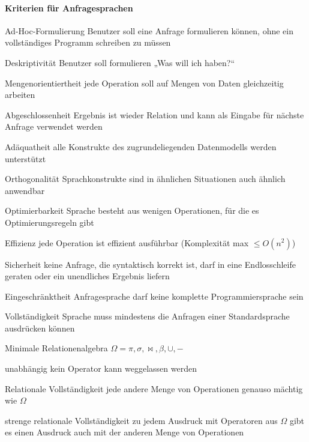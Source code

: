 \documentclass[a4paper]{article}
\begin{document}
\begin{multicols}{3}
    \paragraph{Kriterien für Anfragesprachen}
    \begin{description*}
        \item[Ad-Hoc-Formulierung] Benutzer soll eine Anfrage formulieren können, ohne ein vollständiges Programm schreiben zu müssen
        \item[Deskriptivität] Benutzer soll formulieren „Was will ich haben?“
        \item[Mengenorientiertheit] jede Operation soll auf Mengen von Daten gleichzeitig arbeiten
        \item[Abgeschlossenheit] Ergebnis ist wieder Relation und kann als Eingabe für nächste Anfrage verwendet werden
        \item[Adäquatheit] alle Konstrukte des zugrundeliegenden Datenmodells werden unterstützt
        \item[Orthogonalität] Sprachkonstrukte sind in ähnlichen Situationen auch ähnlich anwendbar
        \item[Optimierbarkeit] Sprache besteht aus wenigen Operationen, für die es Optimierungsregeln gibt
        \item[Effizienz] jede Operation ist effizient ausführbar (Komplexität max $\leq O(n^2)$)
        \item[Sicherheit] keine Anfrage, die syntaktisch korrekt ist, darf in eine Endlosschleife geraten oder ein unendliches Ergebnis liefern
        \item[Eingeschränktheit] Anfragesprache darf keine komplette Programmiersprache sein
        \item[Vollständigkeit] Sprache muss mindestens die Anfragen einer Standardsprache ausdrücken können
        \begin{description*}
            \item[Minimale Relationenalgebra] $\Omega = \pi,\sigma,\bowtie,\beta,\cup, -$
            \item[unabhängig] kein Operator kann weggelassen werden
            \item[Relationale Vollständigkeit] jede andere Menge von Operationen genauso mächtig wie $\Omega$
            \item[strenge relationale Vollständigkeit] zu jedem Ausdruck mit Operatoren aus $\Omega$ gibt es einen Ausdruck auch mit der anderen Menge von Operationen
        \end{description*}
    \end{description*}


\end{multicols}
\end{document}
